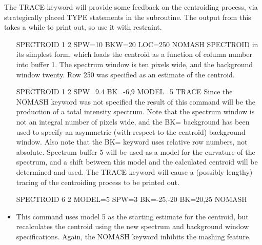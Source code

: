 The TRACE keyword will provide some feedback on the centroiding process,
via strategically placed TYPE statements in the subroutine. The output from
this takes a while to print out, so use it with restraint.

\begin{itemize}
  \item[SPECTROID 1 2 SPW=10 BKW=20 LOC=250 NOMASH\hfill]{ SPECTROID in its
       simplest form, which loads the centroid as a function of column
       number into buffer 1. The spectrum window is ten pixels wide, and
       the background window twenty. Row 250 was specified as an estimate
       of the centroid.}

  \item[SPECTROID 1 2 SPW=9.4 BK=-6,9 MODEL=5 TRACE\hfill]{ Since the NOMASH
       keyword was not specified the result of this command will be the
       production of a total intensity spectrum.  Note that the spectrum
       window is not an integral number of pixels wide, and the BK=
       background has been used to specify an asymmetric (with respect to
       the centroid) background window.  Also note that the BK= keyword
       uses relative row numbers, not absolute.  Spectrum buffer 5 will be
       used as a model for the curvature of the spectrum, and a shift
       between this model and the calculated centroid will be determined
       and used.  The TRACE keyword will cause a (possibly lengthy) tracing
       of the centroiding process to be printed out.}

  \item[SPECTROID 6 2 MODEL=5 SPW=3 BK=-25,-20 BK=20,25 NOMASH\hfill]
  \item{This command uses model 5 as the starting estimate for the
       centroid, but recalculates the centroid using the new spectrum and
       background window specifications.  Again, the NOMASH keyword
       inhibits the mashing feature.}
\end{itemize}

